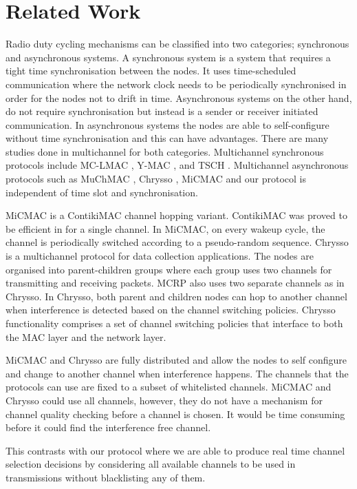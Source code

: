 \section{Related Work}
\label{sec:relatedwork}
Radio duty cycling mechanisms can be classified into two categories; synchronous and asynchronous systems. A synchronous system is a system that requires a tight time synchronisation between the nodes. It uses time-scheduled communication where the network clock needs to be periodically synchronised in order for the nodes not to drift in time. Asynchronous systems on the other hand, do not require synchronisation but instead is a sender or receiver initiated communication. In asynchronous systems the nodes are able to self-configure without time synchronisation and this can have advantages. There are many studies done in multichannel for both categories. Multichannel synchronous protocols include MC-LMAC \cite{mc-lmac}, Y-MAC \cite{y-mac}, and TSCH \cite{tsch}. Multichannel asynchronous protocols such as MuChMAC \cite{muchmac}, Chrysso \cite{chrysso}, MiCMAC \cite{micmac} and our protocol is independent of time slot and synchronisation.  

MiCMAC \cite{micmac} is a ContikiMAC \cite{contikimac} channel hopping variant. ContikiMAC was proved to be efficient in \cite{micmac,orpl} for a single channel. In MiCMAC, on every wakeup cycle, the channel is periodically switched according to a pseudo-random sequence. Chrysso \cite{chrysso} is a multichannel protocol for data collection applications. The nodes are organised into parent-children groups where each group uses two channels for transmitting and receiving packets. MCRP also uses two separate channels as in Chrysso. In Chrysso, both parent and children nodes can hop to another channel when interference is detected based on the channel switching policies. Chrysso functionality comprises a set of channel switching policies that interface to both the MAC layer and the network layer. 

MiCMAC and Chrysso are fully distributed and allow the nodes to self configure and change to another channel when interference happens. The channels that the protocols can use are fixed to a subset of whitelisted channels. MiCMAC and Chrysso could use all channels, however, they do not have a mechanism for channel quality checking before a channel is chosen. It would be time consuming before it could find the interference free channel. 

This contrasts with our protocol where we are able to produce real time channel selection decisions by considering all available channels to be used in transmissions without blacklisting any of them. 


